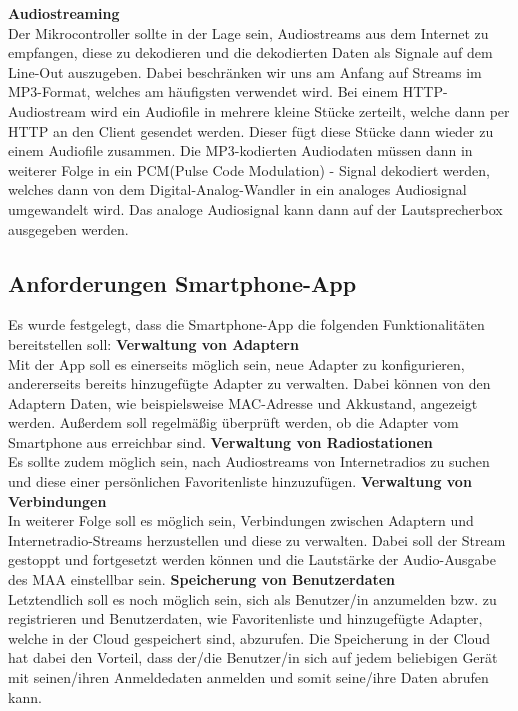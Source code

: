 \documentclass[11pt, twoside]{article}
\begin{document}
\noindent
\textbf{Audiostreaming} \\
Der Mikrocontroller sollte in der Lage sein, Audiostreams aus dem Internet zu empfangen, diese zu dekodieren und die dekodierten Daten als Signale auf dem Line-Out auszugeben. Dabei beschränken wir uns am Anfang auf Streams im MP3-Format, welches am häufigsten verwendet wird. Bei einem HTTP-Audiostream wird ein Audiofile in mehrere kleine Stücke zerteilt, welche dann per HTTP an den Client gesendet werden. Dieser fügt diese Stücke dann wieder zu einem Audiofile zusammen. Die MP3-kodierten Audiodaten müssen dann in weiterer Folge in ein PCM(Pulse Code Modulation) - Signal dekodiert werden, welches dann von dem Digital-Analog-Wandler in ein analoges Audiosignal umgewandelt wird. Das analoge Audiosignal kann dann auf der Lautsprecherbox ausgegeben werden.
\subsection{Anforderungen Smartphone-App}
Es wurde festgelegt, dass die Smartphone-App die folgenden Funktionalitäten bereitstellen soll:
\vspace{4mm}\newline 
\textbf{Verwaltung von Adaptern}  \\
Mit der App soll es einerseits möglich sein, neue Adapter zu konfigurieren, andererseits bereits hinzugefügte Adapter zu verwalten. Dabei können von den Adaptern Daten, wie beispielsweise MAC-Adresse und Akkustand, angezeigt werden. Außerdem soll regelmäßig überprüft werden, ob die Adapter vom Smartphone aus erreichbar sind.
\vspace{4mm}\newline
\textbf{Verwaltung von Radiostationen} \\
Es sollte zudem möglich sein, nach Audiostreams von Internetradios zu suchen und diese einer persönlichen Favoritenliste hinzuzufügen.
\vspace{4mm}\newline
\textbf{Verwaltung von Verbindungen} \\
In weiterer Folge soll es möglich sein, Verbindungen zwischen Adaptern und Internetradio-Streams herzustellen und diese zu verwalten. Dabei soll der Stream gestoppt und fortgesetzt werden können und die Lautstärke der Audio-Ausgabe des MAA einstellbar sein.
\vspace{4mm}\newline
\textbf{Speicherung von Benutzerdaten} \\
Letztendlich soll es noch möglich sein, sich als Benutzer/in anzumelden bzw. zu registrieren und Benutzerdaten, wie Favoritenliste und hinzugefügte Adapter, welche in der Cloud gespeichert sind, abzurufen. Die Speicherung in der Cloud hat dabei den Vorteil, dass der/die Benutzer/in sich auf jedem beliebigen Gerät mit seinen/ihren Anmeldedaten anmelden und somit seine/ihre Daten abrufen kann.
\end{document}
